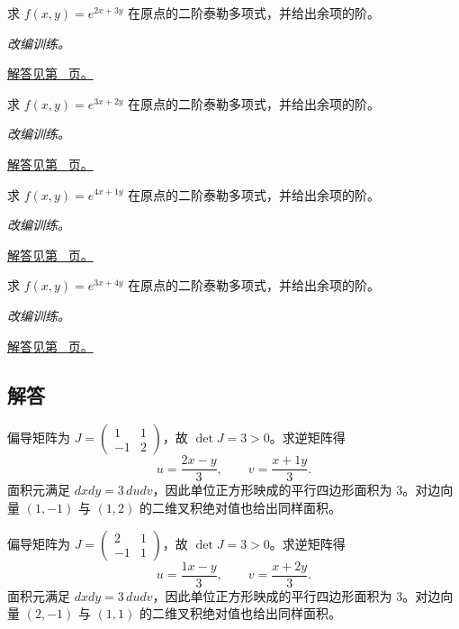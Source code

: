 \documentclass[12pt,fontset=fandol]{ctexart}
\begin{document}
\begin{example}[二元函数的二阶泰勒式]\label{ex:c33q21}
求 $f(x,y)=e^{2x+3y}$ 在原点的二阶泰勒多项式，并给出余项的阶。
\par\textit{改编训练。}\par\hyperref[ans:c33q21]{解答见第~\pageref{ans:c33q21} 页。}
\end{example}
\begin{example}[二元函数的二阶泰勒式]\label{ex:c33q22}
求 $f(x,y)=e^{3x+2y}$ 在原点的二阶泰勒多项式，并给出余项的阶。
\par\textit{改编训练。}\par\hyperref[ans:c33q22]{解答见第~\pageref{ans:c33q22} 页。}
\end{example}
\begin{example}[二元函数的二阶泰勒式]\label{ex:c33q23}
求 $f(x,y)=e^{4x+1y}$ 在原点的二阶泰勒多项式，并给出余项的阶。
\par\textit{改编训练。}\par\hyperref[ans:c33q23]{解答见第~\pageref{ans:c33q23} 页。}
\end{example}
\begin{example}[二元函数的二阶泰勒式]\label{ex:c33q24}
求 $f(x,y)=e^{3x+4y}$ 在原点的二阶泰勒多项式，并给出余项的阶。
\par\textit{改编训练。}\par\hyperref[ans:c33q24]{解答见第~\pageref{ans:c33q24} 页。}
\end{example}
\subsection{解答}
\begin{solve}\label{ans:c33q1}
偏导矩阵为 $J=\begin{pmatrix}1&1\\-1&2\end{pmatrix}$，故 $\det J=3>0$。求逆矩阵得
\[
u=\frac{2x-y}{3},\qquad v=\frac{x+1y}{3}.
\]
面积元满足 $dxdy=3\,dudv$，因此单位正方形映成的平行四边形面积为 $3$。对边向量 $(1,-1)$ 与 $(1,2)$ 的二维叉积绝对值也给出同样面积。
\end{solve}

\begin{solve}\label{ans:c33q2}
偏导矩阵为 $J=\begin{pmatrix}2&1\\-1&1\end{pmatrix}$，故 $\det J=3>0$。求逆矩阵得
\[
u=\frac{1x-y}{3},\qquad v=\frac{x+2y}{3}.
\]
面积元满足 $dxdy=3\,dudv$，因此单位正方形映成的平行四边形面积为 $3$。对边向量 $(2,-1)$ 与 $(1,1)$ 的二维叉积绝对值也给出同样面积。
\end{solve}
\end{document}
